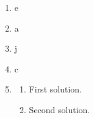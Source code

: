 \documentclass[12pt,twoside]{article}
\makeatletter
\def\emptycleardoublepage{\clearpage\if@twoside \ifodd\c@page\else
\thispagestyle{empty}%
\hbox{}\newpage\if@twocolumn\hbox{}\newpage\fi\fi\fi}
\makeatother
\begin{document}
\begin{multicols}{2}
\begin{enumerate}
 \end{enumerate}\end{multicols}\emptycleardoublepage{}\graphicspath{{C:/Users/iainc/anaconda3/Randomizer/Sample Course/Sample Assessment/}}\begin{multicols}{2} \begin{enumerate}\item e\item a\item j\item c\def \a{7}\def \atwoone{1}\def \atwotwo{-6}\def \atwothree{5}\def \btwothree{6}\def \sumtwothree{11}\def \diftwothree{-1}\def \bigtwothree{500}\def \powtwothree{7776}\def \logtwothree{0.8982444017039272}\def \factortwothree{187}\def \atwofour{1.2}\def \btwofour{1.95}\def \tooshorttwofour{10.1}\def \moneytwofour{10.10}\def \longertwofour{10.10000}\def \atwofive{0.12}\def \btwofive{0.12346}\def \athreeone{4}\def \bthreeone{2}\def \setthreetwo{[2, 5, 6]}\def \athreetwo{2}\def \bthreetwo{5}\def \cthreetwo{6}\def \controlthreethree{8}\def \athreethree{3}\def \topthreethree{0}\def \athreefour{3}\def \bthreefour{5}\def \listthreefour{[1, 2, 4, 5]}\def \afourone{16}\def \bfourone{-6}\def \fracfourone{\frac{-8}{3}}\def \rootfourtwo{20}\def \simplifiedfourtwo{2 \sqrt{5}}\def \sqrtlistfourtwo{[2, 5]}\def \outfourtwo{2}\def \infourtwo{5}\def \wowfourtwo{1}\def \afourthree{5}\def \nicethreefour{3x^{2}-x^{}+5}\def \nastythreefour{xyz^{3}+5}\def \cfourthree{-4}\def \dfourthree{9}\def \infourthree{-4x^{}}\def \outfourthree{+9y^{}}\def \afourfour{1416069}\def \nicefourfour{1,416,069}\def \goodfourfour{1,000,000.12345}\def \badfourfour{1,000,000.1}
\item \begin{enumerate}
\item First solution.
\item Second solution.
\end{enumerate}

\end{enumerate}
\end{multicols}
\end{document}
